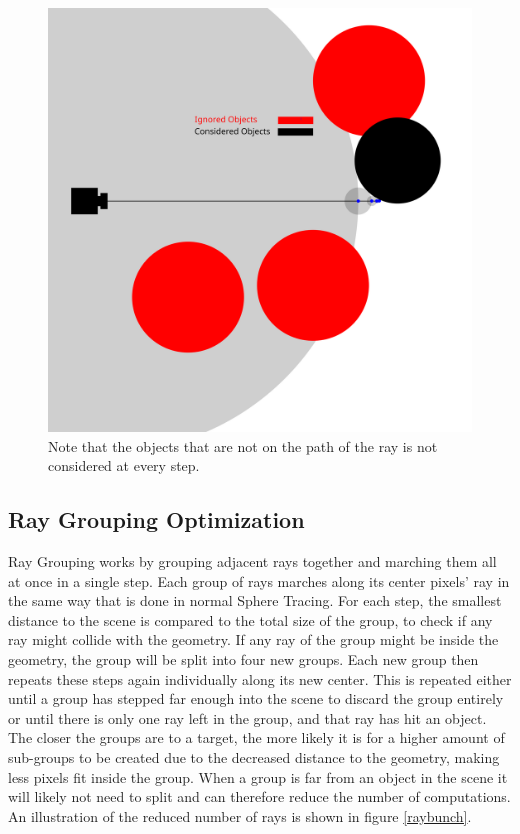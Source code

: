 			\begin{figure}[H]
                \centering
                \includegraphics[width=0.75\linewidth]{figure/WithCulling} 
                \caption{Note that the objects that are not on the path of the ray
                is not considered at every step.}
            \end{figure}

		\subsection{Ray Grouping Optimization}

			Ray Grouping works by grouping adjacent rays together and marching them
			all at once in a single step. Each group of rays marches along its center
			pixels' ray in the same way that is done in normal Sphere Tracing. For
			each step, the smallest distance to the scene is compared to the total
			size of the group, to check if any ray might collide with the geometry.
			If any ray of the group might be inside the geometry, the group will be
			split into four new groups. Each new group then repeats these steps again
			individually along its new center. This is repeated either until a group
			has stepped far enough into the scene to discard the group entirely or
			until there is only one ray left in the group, and that ray has hit an
			object.  The closer the groups are to a target, the more likely it is for
			a higher amount of sub-groups to be created due to the decreased distance
			to the geometry, making less pixels fit inside the group. When a group is
			far from an object in the scene it will likely not need to split and
			can therefore reduce the number of computations. An illustration of the reduced number of rays is shown in figure \ref{raybunch}.

